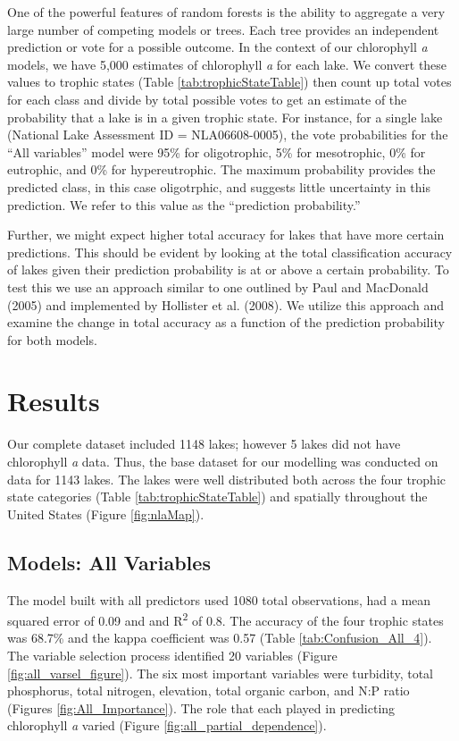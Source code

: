 \documentclass[11pt,]{article}
\begin{document}
One of the powerful features of random forests is the ability to
aggregate a very large number of competing models or trees. Each tree
provides an independent prediction or vote for a possible outcome. In
the context of our chlorophyll \emph{a} models, we have 5,000 estimates
of chlorophyll \emph{a} for each lake. We convert these values to
trophic states (Table \ref {tab:trophicStateTable}) then count up total
votes for each class and divide by total possible votes to get an
estimate of the probability that a lake is in a given trophic state. For
instance, for a single lake (National Lake Assessment ID =
NLA06608-0005), the vote probabilities for the ``All variables'' model
were 95\% for oligotrophic, 5\% for mesotrophic, 0\% for eutrophic, and
0\% for hypereutrophic. The maximum probability provides the predicted
class, in this case oligotrphic, and suggests little uncertainty in this
prediction. We refer to this value as the ``prediction probability.''

Further, we might expect higher total accuracy for lakes that have more
certain predictions. This should be evident by looking at the total
classification accuracy of lakes given their prediction probability is
at or above a certain probability. To test this we use an approach
similar to one outlined by Paul and MacDonald (2005) and implemented by
Hollister et al. (2008). We utilize this approach and examine the change
in total accuracy as a function of the prediction probability for both
models.

\section{Results}\label{results}

Our complete dataset included 1148 lakes; however 5 lakes did not have
chlorophyll \emph{a} data. Thus, the base dataset for our modelling was
conducted on data for 1143 lakes. The lakes were well distributed both
across the four trophic state categories (Table
\ref{tab:trophicStateTable}) and spatially throughout the United States
(Figure \ref{fig:nlaMap}).

\subsection{Models: All Variables}\label{models-all-variables}

The model built with all predictors used 1080 total observations, had a
mean squared error of 0.09 and and R\textsuperscript{2} of 0.8. The
accuracy of the four trophic states was 68.7\% and the kappa coefficient
was 0.57 (Table \ref{tab:Confusion_All_4}). The variable selection
process identified 20 variables (Figure \ref{fig:all_varsel_figure}).
The six most important variables were turbidity, total phosphorus, total
nitrogen, elevation, total organic carbon, and N:P ratio (Figures
\ref{fig:All_Importance}). The role that each played in predicting
chlorophyll \emph{a} varied (Figure \ref{fig:all_partial_dependence}).
\end{document}
